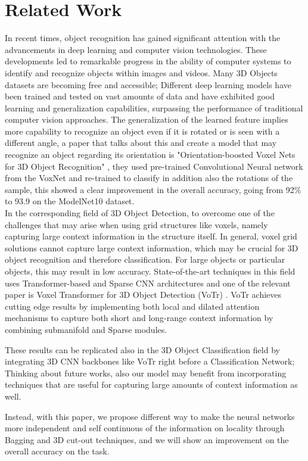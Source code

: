 
\section{Related Work}
\label{sec:related_work}

In recent times, object recognition has gained significant attention with the advancements in deep learning and computer vision technologies. These developments led to remarkable progress in the ability of computer systems to identify and recognize objects within images and videos. Many 3D Objects datasets are becoming free and accessible; Different deep learning models have been trained and tested on vast amounts of data and have exhibited good learning and generalization capabilities, surpassing the performance of traditional computer vision approaches. The generalization of the learned feature implies more capability to recognize an object even if it is rotated or is seen with a different angle, a paper that talks about this and create a model that may recognize an object regarding its orientation is "Orientation-boosted Voxel Nets for 3D Object Recognition" \cite{sedaghat2017orientationboosted}, they used pre-trained Convolutional Neural network from the VoxNet \cite{7353481} and re-trained to classify in addition also the rotations of the sample, this showed a clear improvement in the overall accuracy, going from 92\% to 93.9 on the ModelNet10 dataset.\\

In the corresponding field of 3D Object Detection, to overcome one of the challenges that may arise when using grid structures like voxels, namely capturing large context information in the structure itself.
In general, voxel grid solutions cannot capture large context information, which may be crucial for 3D object recognition and therefore classification. For large objects or particular objects, this may result in low accuracy.
State-of-the-art techniques in this field uses Transformer-based and Sparse CNN architectures and one of the relevant paper is Voxel Transformer for 3D Object Detection (VoTr) \cite{mao2021voxel}.
VoTr achieves cutting edge results by implementing both local and dilated attention mechanisms to capture both short and long-range context information by combining submanifold and Sparse modules.

These results can be replicated also in the 3D Object Classification field by integrating 3D CNN backbones like VoTr right before a Classification Network; Thinking about future works, also our model may benefit from incorporating techniques that are useful for capturing large amounts of context information as well.


Instead, with this paper, we propose different way to make the neural networks more independent and self continuous of the information on locality through Bagging and 3D cut-out techniques, and we will show an improvement on the overall accuracy on the task.
